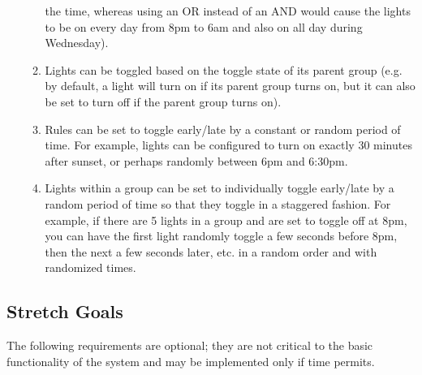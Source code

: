 \documentclass[12pt]{article}
\begin{document}
\begin{enumerate}
\begin{enumerate}
                the time, whereas using an OR instead of an AND would cause the
                lights to be on every day from 8pm to 6am and also on all day
                during Wednesday).
            \item Lights can be toggled based on the toggle state of its parent
                group (e.g. by default, a light will turn on if its parent
                group turns on, but it can also be set to turn off if the
                parent group turns on).
            \item Rules can be set to toggle early/late by a constant or random
                period of time.  For example, lights can be configured to turn
                on exactly 30 minutes after sunset, or perhaps randomly between
                6pm and 6:30pm.
            \item Lights within a group can be set to individually toggle
                early/late by a random period of time so that they toggle in a
                staggered fashion.  For example, if there are 5 lights in a
                group and are set to toggle off at 8pm, you can have the first
                light randomly toggle a few seconds before 8pm, then the next a
                few seconds later, etc. in a random order and with randomized
                times.
        \end{enumerate}
\end{enumerate}

\subsection{Stretch Goals}

The following requirements are optional; they are not critical to the basic
functionality of the system and may be implemented only if time permits.
\end{document}

